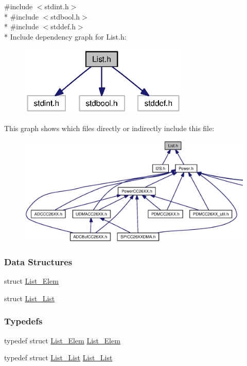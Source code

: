 {\ttfamily \#include $<$stdint.\+h$>$}\\*
{\ttfamily \#include $<$stdbool.\+h$>$}\\*
{\ttfamily \#include $<$stddef.\+h$>$}\\*
Include dependency graph for List.\+h\+:
\nopagebreak
\begin{figure}[H]
\begin{center}
\leavevmode
\includegraphics[width=229pt]{_list_8h__incl}
\end{center}
\end{figure}
This graph shows which files directly or indirectly include this file\+:
\nopagebreak
\begin{figure}[H]
\begin{center}
\leavevmode
\includegraphics[width=350pt]{_list_8h__dep__incl}
\end{center}
\end{figure}
\subsubsection*{Data Structures}
\begin{DoxyCompactItemize}
\item 
struct \hyperlink{struct_list___elem}{List\+\_\+\+Elem}
\item 
struct \hyperlink{struct_list___list}{List\+\_\+\+List}
\end{DoxyCompactItemize}
\subsubsection*{Typedefs}
\begin{DoxyCompactItemize}
\item 
typedef struct \hyperlink{struct_list___elem}{List\+\_\+\+Elem} \hyperlink{_list_8h_a952d8bdbb969ea99ef3cae1808fa851b}{List\+\_\+\+Elem}
\item 
typedef struct \hyperlink{struct_list___list}{List\+\_\+\+List} \hyperlink{_list_8h_a2c84bcdfd05e5108ff99148408f985ab}{List\+\_\+\+List}
\end{DoxyCompactItemize}
